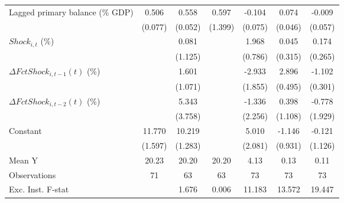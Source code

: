 {\begin{tabular}{l*{6}{c}}
\addlinespace
Lagged primary balance (\% GDP)&       0.506\sym{***}&       0.558\sym{***}&       0.597         &      -0.104         &       0.074         &      -0.009         \\
                    &     (0.077)         &     (0.052)         &     (1.399)         &     (0.075)         &     (0.046)         &     (0.057)         \\
\addlinespace
$ Shock_{i,t}$ (\%) &                     &       0.081         &                     &       1.968\sym{**} &       0.045         &       0.174         \\
                    &                     &     (1.125)         &                     &     (0.786)         &     (0.315)         &     (0.265)         \\
\addlinespace
$ \Delta FctShock_{i,t-1}(t)$ (\%)&                     &       1.601         &                     &      -2.933         &       2.896\sym{***}&      -1.102\sym{***}\\
                    &                     &     (1.071)         &                     &     (1.855)         &     (0.495)         &     (0.301)         \\
\addlinespace
$ \Delta FctShock_{i,t-2}(t)$ (\%)&                     &       5.343         &                     &      -1.336         &       0.398         &      -0.778         \\
                    &                     &     (3.758)         &                     &     (2.256)         &     (1.108)         &     (1.929)         \\
\addlinespace
Constant            &      11.770\sym{***}&      10.219\sym{***}&                     &       5.010\sym{**} &      -1.146         &      -0.121         \\
                    &     (1.597)         &     (1.283)         &                     &     (2.081)         &     (0.931)         &     (1.126)         \\
\midrule
Mean Y              &       20.23         &       20.20         &       20.20         &        4.13         &        0.13         &        0.11         \\
Observations        &          71         &          63         &          63         &          73         &          73         &          73         \\
Exc. Inst. F-stat   &                     &       1.676         &       0.006         &      11.183         &      13.572         &      19.447         \\
\bottomrule
\end{tabular}
}
